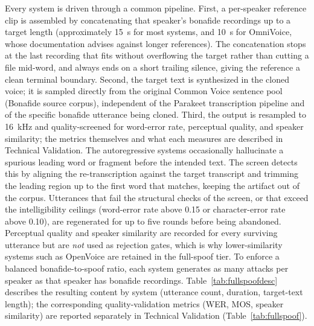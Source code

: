 \documentclass[11pt]{article}
\begin{document}
Every system is driven through a common pipeline. First, a per-speaker
reference clip is assembled by concatenating that speaker's bonafide
recordings up to a target length (approximately \SI{15}{\second} for
most systems, and \SI{10}{\second} for OmniVoice, whose documentation
advises against longer references). The concatenation stops at the last
recording that fits without overflowing the target rather than cutting a
file mid-word, and always ends on a short trailing silence, giving the
reference a clean terminal boundary. Second, the target text is
synthesized in the cloned voice; it is sampled directly from the
original Common Voice sentence pool (Bonafide source corpus),
independent of the Parakeet transcription pipeline and of the specific
bonafide utterance being cloned. Third, the output is resampled to
\SI{16}{\kilo\hertz} and quality-screened for word-error rate,
perceptual quality, and speaker similarity; the metrics themselves and
what each measures are described in Technical Validation. The
autoregressive systems occasionally hallucinate a spurious leading word
or fragment before the intended text. The screen detects this by
aligning the re-transcription against the target transcript and
trimming the leading region up to the first word that matches, keeping
the artifact out of the corpus. Utterances that fail the structural
checks of the screen, or that exceed the intelligibility ceilings
(word-error rate above 0.15 or character-error rate above 0.10), are
regenerated for up to five rounds before being abandoned. Perceptual
quality and speaker similarity are recorded for every surviving
utterance but are \emph{not} used as rejection gates, which is why
lower-similarity systems such as OpenVoice are retained in the
full-spoof tier. To enforce a balanced bonafide-to-spoof ratio, each
system generates as many attacks per speaker as that speaker has
bonafide recordings.
Table~\ref{tab:fullspoofdesc} describes the resulting content by system
(utterance count, duration, target-text length); the corresponding
quality-validation metrics (WER, MOS, speaker similarity) are reported
separately in Technical Validation (Table~\ref{tab:fullspoof}).
\end{document}
